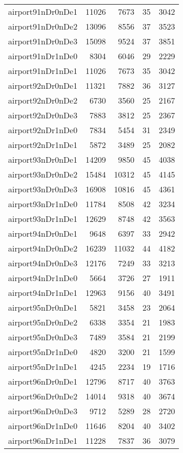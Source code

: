 \begin{longtable}{lrrrr}
airport91nDr0nDe1 & 11026 & 7673 & 35 & 3042 \\
airport91nDr0nDe2 & 13096 & 8556 & 37 & 3523 \\
airport91nDr0nDe3 & 15098 & 9524 & 37 & 3851 \\
airport91nDr1nDe0 & 8304 & 6046 & 29 & 2229 \\
airport91nDr1nDe1 & 11026 & 7673 & 35 & 3042 \\
airport92nDr0nDe1 & 11321 & 7882 & 36 & 3127 \\
airport92nDr0nDe2 & 6730 & 3560 & 25 & 2167 \\
airport92nDr0nDe3 & 7883 & 3812 & 25 & 2367 \\
airport92nDr1nDe0 & 7834 & 5454 & 31 & 2349 \\
airport92nDr1nDe1 & 5872 & 3489 & 25 & 2082 \\
airport93nDr0nDe1 & 14209 & 9850 & 45 & 4038 \\
airport93nDr0nDe2 & 15484 & 10312 & 45 & 4145 \\
airport93nDr0nDe3 & 16908 & 10816 & 45 & 4361 \\
airport93nDr1nDe0 & 11784 & 8508 & 42 & 3234 \\
airport93nDr1nDe1 & 12629 & 8748 & 42 & 3563 \\
airport94nDr0nDe1 & 9648 & 6397 & 33 & 2942 \\
airport94nDr0nDe2 & 16239 & 11032 & 44 & 4182 \\
airport94nDr0nDe3 & 12176 & 7249 & 33 & 3213 \\
airport94nDr1nDe0 & 5664 & 3726 & 27 & 1911 \\
airport94nDr1nDe1 & 12963 & 9156 & 40 & 3491 \\
airport95nDr0nDe1 & 5821 & 3458 & 23 & 2064 \\
airport95nDr0nDe2 & 6338 & 3354 & 21 & 1983 \\
airport95nDr0nDe3 & 7489 & 3584 & 21 & 2199 \\
airport95nDr1nDe0 & 4820 & 3200 & 21 & 1599 \\
airport95nDr1nDe1 & 4245 & 2234 & 19 & 1716 \\
airport96nDr0nDe1 & 12796 & 8717 & 40 & 3763 \\
airport96nDr0nDe2 & 14014 & 9318 & 40 & 3674 \\
airport96nDr0nDe3 & 9712 & 5289 & 28 & 2720 \\
airport96nDr1nDe0 & 11646 & 8204 & 40 & 3402 \\
airport96nDr1nDe1 & 11228 & 7837 & 36 & 3079 \\

\end{longtable}
